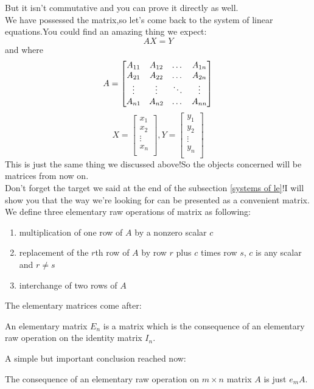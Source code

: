 \documentclass{article}
\begin{document}
But it isn't commutative and you can prove it directly as well.\\
\indent We have possessed the matrix,so let's come back to the system of linear equations.You could find an amazing thing we expect:
\[AX=Y\]and where
\[A=\begin{bmatrix}
	A_{11}&A_{12}&$\ldots$&A_{1n}\\
	A_{21}&A_{22}&$\ldots$&A_{2n}\\
	\vdots&\vdots&\ddots&\vdots\\
	A_{n1}&A_{n2}&$\ldots$&A_{nn}
\end{bmatrix}\]
\[X=\begin{bmatrix}
	x_1\\
	x_2\\
	\vdots\\
	x_n\\
\end{bmatrix},
Y=\begin{bmatrix}
y_1\\
y_2\\
\vdots\\
y_n\\
\end{bmatrix}\]This is just the same thing we discussed above!So the objects concerned will be matrices from now on.\\
\indent Don't forget the target we said at the end of the subsection \ref{systems of le}!I will show you that the way we're looking for can be presented as a convenient matrix.\\
\indent We define three elementary raw operations of matrix as following:
\begin{enumerate}
	\item multiplication of one row of $A$ by a nonzero scalar $c$
	\item replacement of the $r$th row of $A$ by row $r$ plus $c$ times row $s$, $c$ is any scalar and $r\neq s$
	\item interchange of two rows of $A$
\end{enumerate}
The elementary matrices come after:
\begin{dde}
	An elementary matrix $E_n$ is a matrix which is the consequence of an elementary raw operation on the identity matrix $I_n$. 
\end{dde}
A simple but important conclusion reached now:
\begin{pro}
	The consequence of an elementary raw operation on $m\times n$ matrix $A$ is just $e_mA$.
\end{pro}
\end{document}
